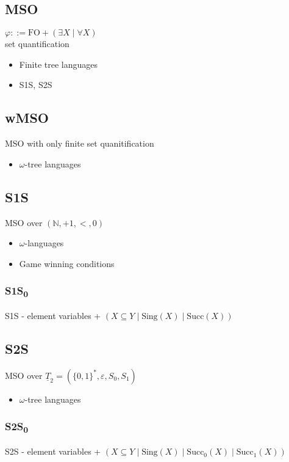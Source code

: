 \documentclass{article}
\begin{document}
\subsection{MSO}
$\varphi ::= \text{FO} + (\exists X \mid \forall X)$ \\
set quantification

\begin{itemize}
	\item Finite tree languages
	\item S1S, S2S
\end{itemize}

\subsection{wMSO}
MSO with only finite set quanitification

\begin{itemize}
	\item $\omega$-tree languages
\end{itemize}

\subsection{S1S}
MSO over $(\mathbb{N}, +1, <, 0)$

\begin{itemize}
	\item $\omega$-languages
	\item Game winning conditions
\end{itemize}

\subsubsection*{S1S\textsubscript{0}}
S1S - element variables + $(X \subseteq Y \mid \text{Sing}(X) \mid \text{Succ}(X))$

\subsection{S2S}
MSO over $\underline{T}_2 = (\{0, 1\}^*, \varepsilon, S_0, S_1)$

\begin{itemize}
	\item $\omega$-tree languages
\end{itemize}

\subsubsection*{S2S\textsubscript{0}}
S2S - element variables + $(X \subseteq Y \mid \text{Sing}(X) \mid \text{Succ}_0(X) \mid \text{Succ}_1(X))$
\end{document}
